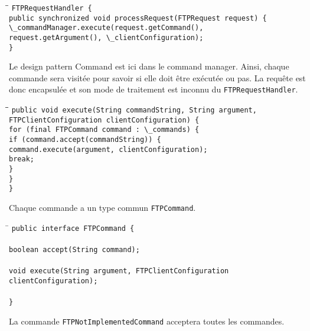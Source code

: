 \begin{tabbing}
\hspace{1cm}\=\hspace{1cm}\=\kill
\verb+FTPRequestHandler {+\\
	\>\verb+public synchronized void processRequest(FTPRequest request) {+\\
	\>\>\verb+\_commandManager.execute(request.getCommand(),+\\ 	\>\>\verb+request.getArgument(), \_clientConfiguration);+\\
\verb+}+
\end{tabbing}

Le design pattern Command est ici dans le command manager. Ainsi, chaque commande sera visitée pour savoir si elle doit être exécutée ou pas. La requête est donc encapsulée et son mode de traitement est inconnu du \verb+FTPRequestHandler+.\\

\begin{tabbing}
\hspace{1cm}\=\hspace{1cm}\=\hspace{1cm}\=\kill
\verb+public void execute(String commandString, String argument,+\\
\verb+FTPClientConfiguration clientConfiguration) {+\\
		\>\verb+for (final FTPCommand command : \_commands) {+\\
			\>\>\verb+if (command.accept(commandString)) {+\\
				\>\>\>\verb+command.execute(argument, clientConfiguration);+\\
				\>\>\>\verb+break;+\\
			\>\>\verb+}+\\
		\>\verb+}+\\
	\verb+}+\\
\end{tabbing}
Chaque commande a un type commun \verb+FTPCommand+.

\begin{tabbing}
\hspace{1cm}\=\kill
\verb+public interface FTPCommand {+\\
\\
    \>\verb+boolean accept(String command);+\\
\\
    \>\verb+void execute(String argument, FTPClientConfiguration clientConfiguration);+\\
\\
\verb+}+
\end{tabbing}
La commande \verb+FTPNotImplementedCommand+ acceptera toutes les commandes.